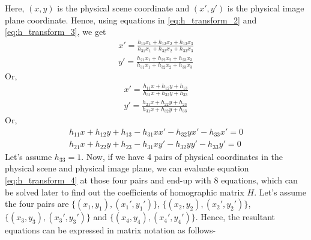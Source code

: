 \documentclass{article}
\begin{document}
Here, $(x,y)$ is the physical scene coordinate and $(x',y')$ is the physical image plane coordinate. Hence, using equations in \ref{eq:h_transform_2} and \ref{eq:h_transform_3}, we get
\begin{subequations}
	\begin{eqnarray}
		x' = \frac{h_{11}x_1 + h_{12}x_2 + h_{13}x_3}{h_{31}x_1 + h_{32}x_2 + h_{33}x_3}\\
		y' = \frac{h_{21}x_1 + h_{22}x_2 + h_{23}x_3}{h_{31}x_1 + h_{32}x_2 + h_{33}x_3}
	\end{eqnarray}
\end{subequations}
Or,
\begin{subequations}
	\begin{eqnarray}
		x' = \frac{h_{11}x + h_{12}y + h_{13}}{h_{31}x + h_{32}y + h_{33}}\\
		y' = \frac{h_{21}x + h_{22}y + h_{23}}{h_{31}x + h_{32}y + h_{33}}
	\end{eqnarray}
\end{subequations}
Or,
\begin{subequations}
	\begin{eqnarray}
		h_{11}x + h_{12}y + h_{13} - h_{31}xx' - h_{32}yx' - h_{33}x' = 0\\
		h_{21}x + h_{22}y + h_{23} - h_{31}xy' - h_{32}yy' - h_{33}y' = 0
	\label{eq:h_transform_4}
	\end{eqnarray}
\end{subequations}
Let's assume $h_{33}=1$. Now, if we have 4 pairs of physical coordinates in the physical scene and physical image plane, we can evaluate equation \ref{eq:h_transform_4} at those four pairs and end-up with 8 equations, which can be solved later to find out the coefficients of homographic matrix $H$. Let's assume the four pairs are $\{(x_1,y_1),(x_1',y_1')\}$, $\{(x_2,y_2),(x_2',y_2')\}$, $\{(x_3,y_3),(x_3',y_3')\}$ and $\{(x_4,y_4),(x_4',y_4')\}$. Hence, the resultant equations can be expressed in matrix notation as follows-
\end{document}
